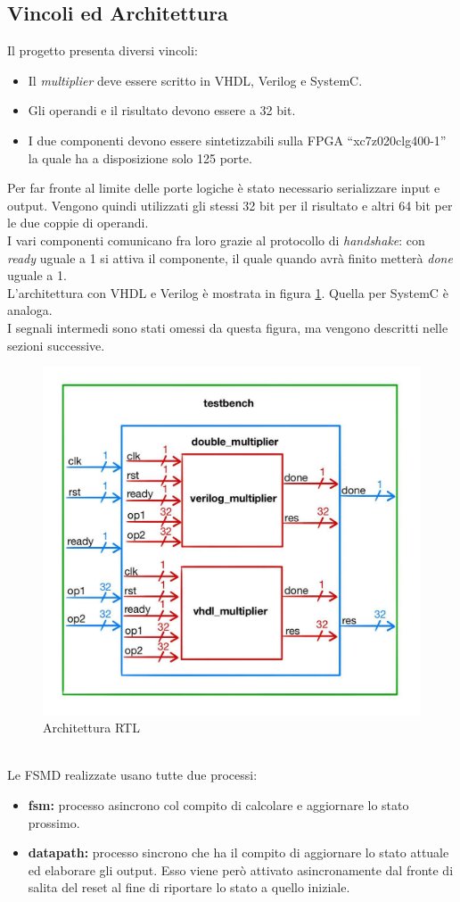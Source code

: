 \documentclass[]{IEEEtran}
\begin{document}
\subsection{Vincoli ed Architettura}
Il progetto presenta diversi vincoli:
\begin{itemize}
    \item Il \textit{multiplier} deve essere scritto in VHDL, Verilog e SystemC.
    \item Gli operandi e il risultato devono essere a 32 bit.
    \item I due componenti devono essere sintetizzabili sulla FPGA ``xc7z020clg400-1'' la quale ha a disposizione solo 125 porte.
\end{itemize}
Per far fronte al limite delle porte logiche è stato necessario serializzare input e output. Vengono quindi utilizzati gli stessi 32 bit per il risultato e altri 64 bit per le due coppie di operandi.
\\I vari componenti comunicano fra loro grazie al protocollo di \textit{handshake}: con \textit{ready} uguale a 1 si attiva il componente, il quale quando avrà finito metterà \textit{done} uguale a 1.
\\L'architettura con VHDL e Verilog è mostrata in figura \ref{fig:Architettura}. Quella per SystemC è analoga.
\\I segnali intermedi sono stati omessi da questa figura, ma vengono descritti nelle sezioni successive.
\begin{figure}[!htb]
    \centering
    \includegraphics[width=0.8\linewidth]{figures/architettura}
    \caption{Architettura RTL}
    \label{fig:Architettura}
\end{figure}
\\Le FSMD realizzate usano tutte due processi:
\begin{itemize}
    \item \textbf{fsm:} processo asincrono col compito di calcolare e aggiornare lo stato prossimo.
    \item \textbf{datapath:} processo sincrono che ha il compito di aggiornare lo stato attuale ed elaborare gli output. Esso viene però attivato asincronamente dal fronte di salita del reset al fine di riportare lo stato a quello iniziale.
\end{itemize}
\end{document}
